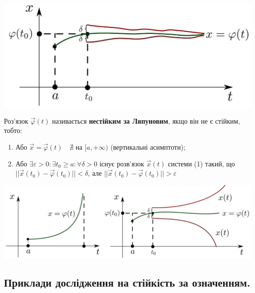 \documentclass[14pt,a4paper]{scrartcl}
\theoremstyle{definition}
\theoremstyle{definition}
\theoremstyle{definition}
\begin{document}
\begin{center} \includegraphics[scale=0.35]{assets/lect2.jpg} \end{center}

Роз'язок $\overrightarrow{\varphi}(t)$ називається \textbf{нестійким за Ляпуновим}, якщо він не є стійким, тобто:
\ed

\begin{enumerate}
  \item Або $\overrightarrow{x} = \overrightarrow{\varphi}(t) \quad \nexists$ на  $[a, +\infty)$ (вертикальні асимптоти);
  \item Або $\exists \varepsilon > 0 : \exists t_0 \geq a :  \forall \delta > 0$ існує розв'язок $\overrightarrow{x}(t)$ системи (1) такий, що $||\overrightarrow{x}(t_0) - \overrightarrow{\varphi}(t_0)|| < \delta$, але $||\overrightarrow{x}(t_0) - \overrightarrow{\varphi}(t_0)|| > \varepsilon$
\end{enumerate}

\vfill
\begin{center} \includegraphics[scale=1.15]{assets/lect3+4.jpg} \end{center}
\vfill
\subsection{Приклади дослідження на стійкість за означенням.}
\end{document}
